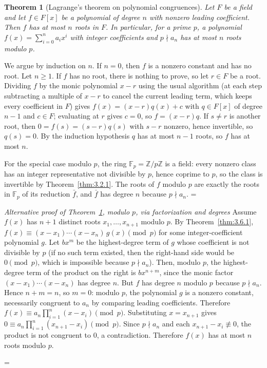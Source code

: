 \documentclass[11pt]{article}
\makeatletter
\let\nt@closedisplay\]
\def\nt@guardedclose{\@ifnextchar\par{\nt@closeafterpar}{\@ifnextchar\end{\postdisplaypenalty\@M\nt@closedisplay}{\nt@closedisplay}}}
\def\nt@closeafterpar\par{\@ifnextchar\par{\nt@closeafterpar}{\@ifnextchar\end{\postdisplaypenalty\@M\nt@closedisplay\par}{\nt@closedisplay\par}}}
\renewenvironment{proof}[1][\proofname]{\par
  \pushQED{\qed}\normalfont\topsep\medskipamount\edef\nt@afterproof{\@endparpenalty=\the\@endparpenalty\relax}\@beginparpenalty\@M\@endparpenalty\@M\let\]\nt@guardedclose\trivlist\item[]\textit{#1\@addpunct{.}} \ignorespaces}{\ifvmode\addpenalty\@M\fi\popQED\nt@afterproof\endtrivlist\@endpefalse}
\theoremstyle{ntstyle}
\newtheorem{theorem}{Theorem}[subsection]
\newenvironment{altproof}[1][\proofname]
  {\begin{proof}[#1]\renewcommand{\qedsymbol}{}}{\end{proof}}
\makeatother
\begin{document}
\begin{theorem}[Lagrange's theorem on polynomial congruences]\label{thm:3.6.2}\label{thm:lagrange-theorem-on-polynomial-congruences}
  Let $F$ be a
  field and let $f\in F[x]$ be a polynomial of degree $n$ with nonzero
  leading coefficient. Then $f$ has at most $n$ roots in $F$. In particular,
  for a prime $p$, a polynomial $f(x)=\sum_{i=0}^{n} a_i x^{i}$ with integer
  coefficients and $p \nmid a_n$ has at most $n$ roots modulo $p$.

\end{theorem}

\begin{proof} We argue by induction on $n$. If $n=0$, then $f$ is a nonzero constant
  and has no root. Let $n\ge1$. If $f$ has no root, there is nothing to prove,
  so let $r\in F$ be a root. Dividing $f$ by the monic polynomial $x-r$ using the
  usual algorithm (at each step subtracting a multiple of $x-r$ to cancel
  the current leading term, which keeps every coefficient in $F$) gives
  $f(x)=(x-r)q(x)+c$ with $q\in F[x]$ of degree $n-1$ and $c\in F$; evaluating
  at $r$ gives $c=0$, so $f=(x-r)q$. If $s\neq r$ is another root, then
  $0=f(s)=(s-r)q(s)$ with $s-r$ nonzero, hence invertible, so $q(s)=0$. By the
  induction hypothesis $q$ has at most $n-1$ roots, so $f$ has at most $n$.

  For the special case modulo $p$, the ring $\mathbb{F}_p=\mathbb{Z}/p\mathbb{Z}$ is a field:
  every nonzero class has an integer representative not divisible by $p$,
  hence coprime to $p$, so the class is invertible by
  Theorem~\ref{thm:3.2.1}. The roots of $f$ modulo $p$ are exactly the
  roots in $\mathbb{F}_p$ of its reduction $\bar f$, and $\bar f$ has degree
  $n$ because $p\nmid a_n$.
\end{proof}

\begin{altproof}[Alternative proof of Theorem~\ref{thm:3.6.2}, modulo $p$, via factorization and degrees] Assume $f(x)$ has $n+1$ distinct roots
  $x_1, \ldots, x_{n+1}$ modulo $p$. By Theorem~\ref{thm:3.6.1},
  $f(x) \equiv (x - x_1) \cdots (x - x_n)\, g(x) \pmod{p}$ for some integer-coefficient
  polynomial $g$. Let $b x^m$ be the highest-degree term of $g$ whose
  coefficient is not divisible by $p$ (if no such term existed, then the
  right-hand side would be $0 \pmod{p}$, which is impossible because $p\nmid a_n$).
  Then, modulo $p$, the highest-degree term of the product on the right is
  $b x^{n+m}$, since the monic factor $(x-x_1)\cdots(x-x_n)$ has degree
  $n$. But $f$ has degree $n$ modulo $p$ because $p\nmid a_n$. Hence
  $n+m=n$, so $m=0$: modulo $p$, the polynomial $g$ is a nonzero constant, necessarily
  congruent to $a_n$ by comparing leading coefficients. Therefore
  $f(x) \equiv a_n \prod_{i=1}^{n}(x - x_i) \pmod{p}$. Substituting
  $x = x_{n+1}$ gives $0 \equiv a_n \prod_{i=1}^{n}(x_{n+1} - x_i) \pmod{p}$. Since $p \nmid a_n$ and each
  $x_{n+1} - x_i \not\equiv 0$,
  the product is not congruent to $0$, a contradiction. Therefore $f(x)$ has
  at most $n$ roots modulo $p$.

\end{altproof}
\newpage
\end{document}
